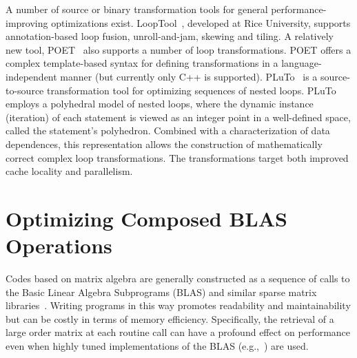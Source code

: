 \documentclass[runningheads]{llncs}
\begin{document}

A number of source or binary transformation tools for general
performance-improving optimizations exist. LoopTool~\cite{LoopTool},
developed at Rice University, supports annotation-based loop fusion,
unroll-and-jam, skewing and tiling.  A relatively new tool, POET~\cite{POET}
also supports a number of loop transformations. POET offers a complex
template-based syntax for defining transformations in a language-independent
manner (but currently only C++ is supported). 
PLuTo~\cite{Pluto}
is a source-to-source transformation tool for
optimizing sequences of nested loops. PLuTo employs a polyhedral model of
nested loops, where the dynamic instance (iteration) of each statement is
viewed as an integer point in a well-defined space, called the statement's
polyhedron. Combined with a characterization of data dependences, this
representation allows the construction of mathematically correct complex loop
transformations. The transformations target both improved cache locality and
parallelism.

\section{Optimizing Composed BLAS Operations}
\label{sec:approach}

Codes based on matrix algebra are generally constructed as a sequence of
calls to the Basic Linear Algebra Subprograms
(BLAS)
and similar
sparse matrix libraries~\cite{Saad:fr,George:1981uq}. Writing programs in
this way promotes readability and maintainability but can be costly in terms
of memory efficiency. Specifically, the retrieval of a large order matrix at
each routine call can have a profound effect on performance even when highly
tuned implementations of the BLAS (e.g.,~\cite{Goto:2006fk})
are used.
\end{document}
